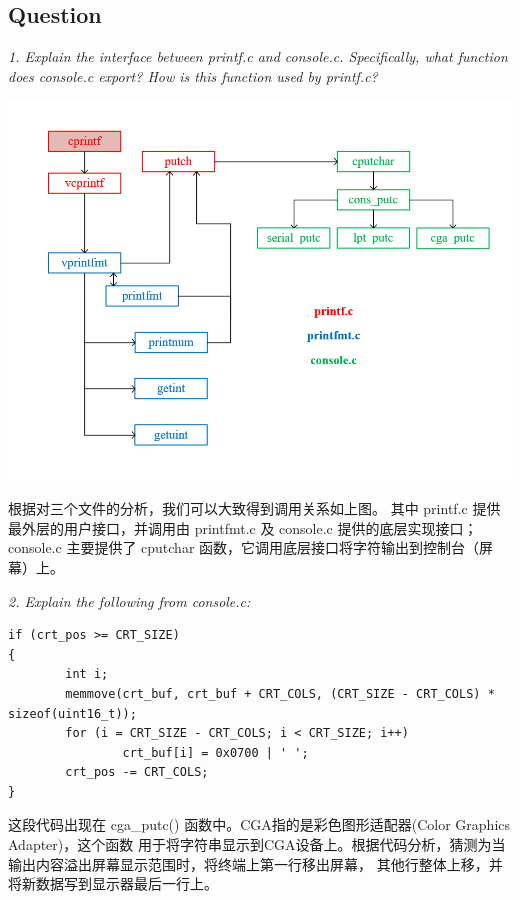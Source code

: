 \documentclass[12pt, letterpaper]{report}
\begin{document}
\subsection{\large Question}
\textsl{1. Explain the interface between printf.c and console.c. 
        Specifically, what function does console.c export? 
        How is this function used by printf.c?} \par
\includegraphics[width=\textwidth]{cprintf_callchain} \par
根据对三个文件的分析，我们可以大致得到调用关系如上图。
其中 printf.c 提供最外层的用户接口，并调用由 printfmt.c 及 console.c 提供的底层实现接口；
console.c 主要提供了 cputchar 函数，它调用底层接口将字符输出到控制台（屏幕）上。 \par 
\quad \par


\textsl{2. Explain the following from console.c:} \par
\lstset{style=CStyle}
\setmainfont{Consolas}
\begin{lstlisting}
if (crt_pos >= CRT_SIZE) 
{
        int i;
        memmove(crt_buf, crt_buf + CRT_COLS, (CRT_SIZE - CRT_COLS) * sizeof(uint16_t));
        for (i = CRT_SIZE - CRT_COLS; i < CRT_SIZE; i++)
                crt_buf[i] = 0x0700 | ' ';
        crt_pos -= CRT_COLS;
}
\end{lstlisting}
\setmainfont{Times New Roman} \par
这段代码出现在 cga\_putc() 函数中。CGA指的是彩色图形适配器(Color Graphics Adapter)，这个函数
用于将字符串显示到CGA设备上。根据代码分析，猜测为当输出内容溢出屏幕显示范围时，将终端上第一行移出屏幕，
其他行整体上移，并将新数据写到显示器最后一行上。 \par 
\quad \par 
\quad \par
\end{document}
